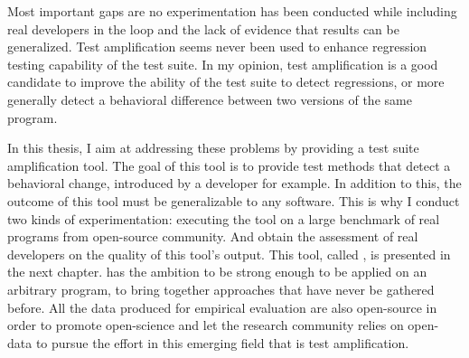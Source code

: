 Most important gaps are no experimentation has been conducted while including real developers in the loop and the lack of evidence that results can be generalized.
Test amplification seems never been used to enhance regression testing capability of the test suite.
In my opinion, test amplification is a good candidate to improve the ability of the test suite to detect regressions, or more generally detect a behavioral difference between two versions of the same program.

In this thesis, I aim at addressing these problems by providing a test suite amplification tool.
The goal of this tool is to provide test methods that detect a behavioral change, introduced by a developer for example.
In addition to this, the outcome of this tool must be generalizable to any software.
This is why I conduct two kinds of experimentation: executing the tool on a large benchmark of real programs from open-source community.
And obtain the assessment of real developers on the quality of this tool's output.
This tool, called \dspot, is presented in the next chapter.
\dspot has the ambition to be strong enough to be applied on an arbitrary program, to bring together approaches that have never be gathered before.
All the data produced for empirical evaluation are also open-source in order to promote open-science and let the research community relies on open-data to pursue the effort in this emerging field that is test amplification.